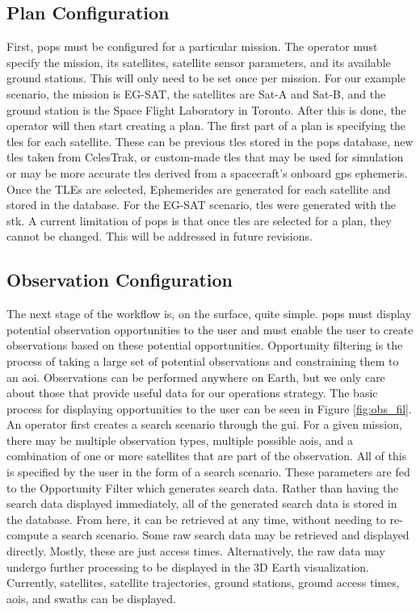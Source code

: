 \subsection{Plan Configuration}

First, \gls{pops} must be configured for a particular mission. The operator
must specify the mission, its satellites, satellite sensor parameters, and its
available ground stations. This will only need to be set once per mission. For
our example scenario, the mission is EG-SAT, the satellites are Sat-A and
Sat-B, and the ground station is the Space Flight Laboratory in Toronto. After
this is done, the operator will then start creating a plan. The first part of a
plan is specifying the \glspl{tle} for each satellite. These can be previous
\glspl{tle} stored in the \gls{pops} database, new \glspl{tle} taken from
CelesTrak, or custom-made \glspl{tle} that may be used for simulation or may be
more accurate \glspl{tle} derived from a spacecraft’s onboard \gls{gps}
ephemeris.  Once the TLEs are selected, Ephemerides are generated for each
satellite and stored in the database. For the EG-SAT scenario, \glspl{tle} were
generated with the \gls{stk}. A current limitation of \gls{pops} is that once
\glspl{tle} are selected for a plan, they cannot be changed. This will be
addressed in future revisions. 

\subsection{Observation Configuration}


The next stage of the workflow is, on the surface, quite simple. \gls{pops}
must display potential observation opportunities to the user and must enable
the user to create observations based on these potential opportunities.
Opportunity filtering is the process of taking a large set of potential
observations and constraining them to an \gls{aoi}. Observations can be
performed anywhere on Earth, but we only care about those that provide useful
data for our operations strategy.  The basic process for displaying
opportunities to the user can be seen in Figure \ref{fig:obs_fil}. An operator
first creates a search scenario through the \gls{gui}.  For a given mission,
there may be multiple observation types, multiple possible \glspl{aoi}, and a
combination of one or more satellites that are part of the observation. All of
this is specified by the user in the form of a search scenario. These
parameters are fed to the Opportunity Filter which generates search data.
Rather than having the search data displayed immediately, all of the generated
search data is stored in the database. From here, it can be retrieved at any
time, without needing to re-compute a search scenario. Some raw search data may
be retrieved and displayed directly. Mostly, these are just access times.
Alternatively, the raw data may undergo further processing to be displayed in
the 3D Earth visualization. Currently, satellites, satellite trajectories,
ground stations, ground access times, \glspl{aoi}, and swaths can be displayed.


